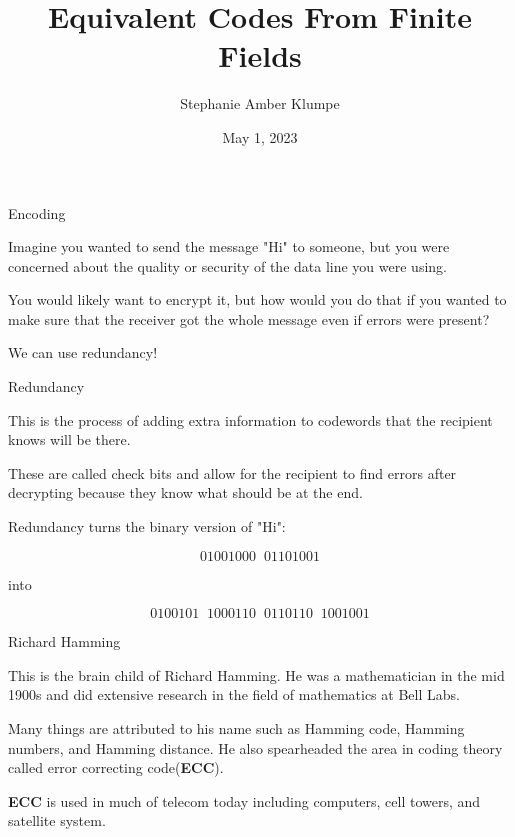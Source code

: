 \documentclass{beamer}
\title{Equivalent Codes From Finite Fields}
\author{Stephanie Amber Klumpe}
\institute{University of Colorado at Colorado Springs}
\date{May 1, 2023}
\begin{document}
\begin{frame}
    \titlepage
\end{frame}

\begin{frame}{Encoding}
    
    Imagine you wanted to send the message "Hi" to someone, but you were concerned about the quality
    or security of the data line you were using.

    \medskip

    \pause

    You would likely want to encrypt it, but how would you do that if you wanted to make sure that the
    receiver got the whole message even if errors were present?

    \bigskip

    \pause

    We can use redundancy!

\end{frame}

\begin{frame}{Redundancy}
    
    This is the process of adding extra information to codewords that the recipient knows will be there.

    \bigskip

    These are called check bits and allow for the recipient to find errors after decrypting because they
    know what should be at the end.

    \bigskip

    \pause

    Redundancy turns the binary version of "Hi":
    
    $$01001000\;\;01101001$$
    
    into
    
    $$0100101\;\;1000110\;\;0110110\;\;1001001$$

\end{frame}

\begin{frame}{Richard Hamming}
    
    This is the brain child of Richard Hamming. He was a mathematician in the mid 1900s and did
    extensive research in the field of mathematics at Bell Labs.

    \bigskip

    Many things are attributed to his name such as Hamming code, Hamming numbers, and Hamming distance.
    He also spearheaded the area in coding theory called error correcting code(\textbf{ECC}).

    \bigskip

    \pause

    \textbf{ECC} is used in much of telecom today including computers, cell towers, and satellite system.

\end{frame}
\end{document}
